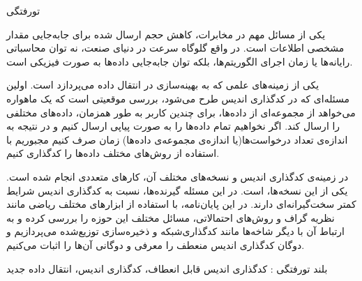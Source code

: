 


\begin{وسط‌چین}
\end{وسط‌چین}
‌تورفتگی

یکی از مسائل مهم در مخابرات، کاهش حجم ارسال شده برای جابه‌جایی مقدار مشخصی اطلاعات است. در واقع گلوگاه سرعت در دنیای صنعت، نه توان محاسباتی رایانه‌ها یا زمان اجرای الگوریتم‌ها، بلکه توان جابه‌جایی داده‌ها به صورت فیزیکی است.

یکی از زمینه‌های علمی که به بهینه‌سازی در انتقال داده می‌پردازد است. اولین مسئله‌ای که در کدگذاری اندیس طرح می‌شود، بررسی موقعیتی است که یک ماهواره می‌خواهد از مجموعه‌ای از داده‌ها، برای چندین کاربر به طور همزمان، داده‌های مختلفی را ارسال کند. اگر نخواهیم تمام داده‌ها را به صورت پیاپی ارسال کنیم و در نتیجه به اندازه‌ی تعداد درخواست‌ها(یا اندازه‌ی مجموعه‌ی داده‌ها) زمان صرف کنیم مجبوریم با استفاده از روش‌های مختلف داده‌ها را کدگذاری کنیم.

در زمینه‌ی کدگذاری اندیس و نسخه‌های مختلف آن، کارهای متعددی انجام شده است. یکی از این نسخه‌ها،  است. در این مسئله گیرنده‌ها، نسبت به کدگذاری اندیس شرایط کمتر سخت‌گیرانه‌ای دارند. در این پایان‌‌نامه، با استفاده از ابزارهای مختلف ریاضی مانند نظریه گراف و روش‌های احتمالاتی، مسائل مختلف این حوزه را بررسی کرده و به ارتباط آن با دیگر شاخه‌ها مانند کدگذار‌ی‌شبکه و ذخیره‌سازی توزیع‌شده می‌پردازیم و دوگان کدگذاری اندیس منعطف را معرفی و دوگانی آن‌ها را اثبات می‌کنیم.

‌بلند
‌تورفتگی :
کدگذاری اندیس قابل انعطاف، کدگذاری اندیس، انتقال داده
‌جدید
